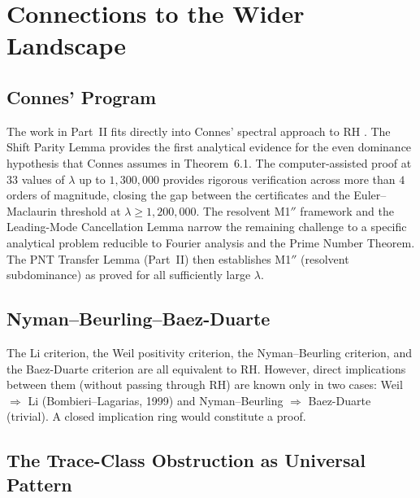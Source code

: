 \documentclass[12pt,a4paper]{article}
\theoremstyle{definition}
\theoremstyle{remark}
\begin{document}
\section{Connections to the Wider Landscape}
\label{sec:connections}

\subsection{Connes' Program}

The work in Part~II fits directly into Connes' spectral approach to RH \cite{Connes2025}. The Shift Parity Lemma provides the first analytical evidence for the even dominance hypothesis that Connes assumes in Theorem~6.1. The computer-assisted proof at $33$ values of $\lambda$ up to $1{,}300{,}000$ provides rigorous verification across more than $4$ orders of magnitude, closing the gap between the certificates and the Euler--Maclaurin threshold at $\lambda \geq 1{,}200{,}000$. The resolvent M1$''$ framework and the Leading-Mode Cancellation Lemma narrow the remaining challenge to a specific analytical problem reducible to Fourier analysis and the Prime Number Theorem. The PNT Transfer Lemma (Part~II) then establishes M1$''$ (resolvent subdominance) as proved for all sufficiently large $\lambda$.

\subsection{Nyman--Beurling--Baez-Duarte}

The Li criterion, the Weil positivity criterion, the Nyman--Beurling criterion, and the Baez-Duarte criterion are all equivalent to RH. However, direct implications between them (without passing through RH) are known only in two cases: Weil $\Rightarrow$ Li (Bombieri--Lagarias, 1999) and Nyman--Beurling $\Rightarrow$ Baez-Duarte (trivial). A closed implication ring would constitute a proof.

\subsection{The Trace-Class Obstruction as Universal Pattern}
\end{document}

